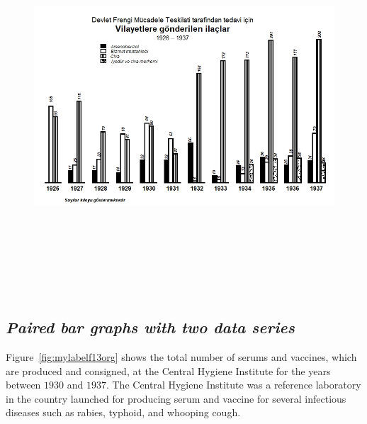 \begin{figure}[hbt!]
	\centering
	\includegraphics[width=12cm,height=14cm,keepaspectratio]{Frengirep.png}
\end{figure}


\subsection{\textit{Paired bar graphs with two data series}} 

Figure~\ref{fig:mylabelf13org} shows the total number of serums and vaccines, which are produced and consigned, at the Central Hygiene Institute for the years between $1930$ and $1937$. The Central Hygiene Institute was a reference laboratory in the country launched for producing serum and vaccine for several infectious diseases such as rabies, typhoid, and whooping cough. 

